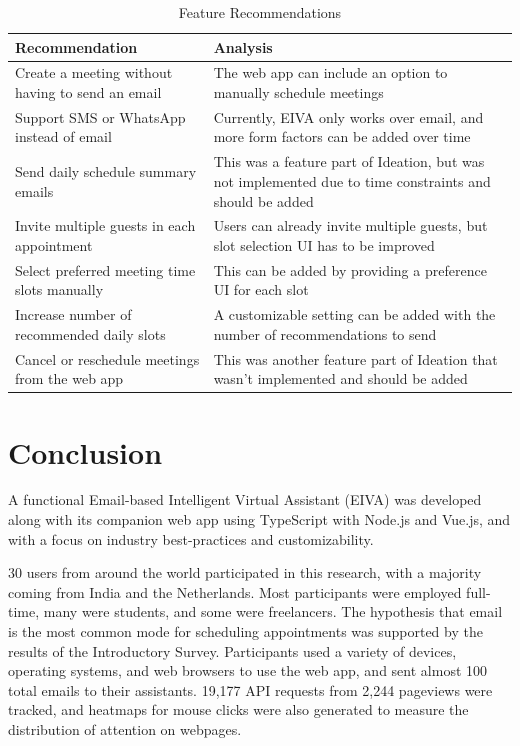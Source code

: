 \documentclass{article}
\begin{document}
\begin{table}[!htb]
	\caption{Feature Recommendations}
	\centering
	\begin{tabular}{p{4cm}p{7cm}}
		\hline
		\textbf{Recommendation}                          & \textbf{Analysis}                                                                                        \\
		\hline
		Create a meeting without having to send an email & The web app can include an option to manually schedule meetings                                          \\
		\hline
		Support SMS or WhatsApp instead of email         & Currently, EIVA only works over email, and more form factors can be added over time                      \\
		\hline
		Send daily schedule summary emails               & This was a feature part of Ideation, but was not implemented due to time constraints and should be added \\
		\hline
		Invite multiple guests in each appointment       & Users can already invite multiple guests, but slot selection UI has to be improved                       \\
		\hline
		Select preferred meeting time slots manually     & This can be added by providing a preference UI for each slot                                             \\
		\hline
		Increase number of recommended daily slots       & A customizable setting can be added with the number of recommendations to send                           \\
		\hline
		Cancel or reschedule meetings from the web app   & This was another feature part of Ideation that wasn't implemented and should be added                    \\
		\hline
	\end{tabular}
\end{table}

\newpage

\section{Conclusion}

A functional Email-based Intelligent Virtual Assistant (EIVA) was developed along with its companion web app using TypeScript with Node.js and Vue.js, and with a focus on industry best-practices and customizability.

30 users from around the world participated in this research, with a majority coming from India and the Netherlands. Most participants were employed full-time, many were students, and some were freelancers. The hypothesis that email is the most common mode for scheduling appointments was supported by the results of the Introductory Survey. Participants used a variety of devices, operating systems, and web browsers to use the web app, and sent almost 100 total emails to their assistants. 19,177 API requests from 2,244 pageviews were tracked, and heatmaps for mouse clicks were also generated to measure the distribution of attention on webpages.
\end{document}
